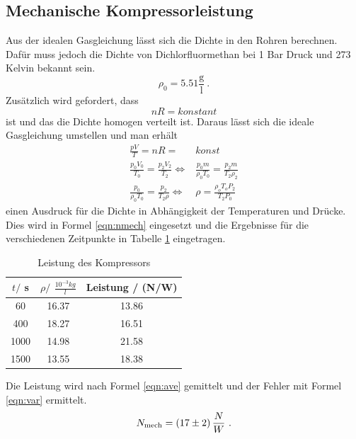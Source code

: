 \subsection{Mechanische Kompressorleistung}
Aus der idealen Gasgleichung lässt sich die Dichte in den Rohren berechnen. Dafür muss jedoch die Dichte von Dichlorfluormethan bei 1 Bar Druck und 273 Kelvin bekannt sein.
\begin{equation}
  \rho_\text{0} =  5.51 \frac{\text{g}}{\text{l}} \ .
  \label{rho}
\end{equation}
Zusätzlich wird gefordert, dass
\begin{equation}
  nR = konstant
\end{equation}
ist und das die Dichte homogen verteilt ist. Daraus lässt sich die ideale Gasgleichung umstellen und man erhält
\begin{eqnarray*}
  \frac{pV}{T} =nR =& konst \\
  \frac{p_0 V_0}{T_0} = \frac{p_2 V_2}{T_\text{2}}  \Leftrightarrow&  \frac{p_0 m}{\rho_0 T_0} = \frac{p_2 m}{T_\text{2} \rho_2} \\
  \frac{p_0}{\rho_0 T_0} = \frac{p_2}{T_\text{2} \rho} \Leftrightarrow& \rho = \frac{\rho_o T_o P_2}{T_\text{2} P_0}
  \label{eqn:rho}
\end{eqnarray*}
einen Ausdruck für die Dichte in Abhängigkeit der Temperaturen und Drücke. Dies wird in Formel \ref{eqn:nmech} eingesetzt und die Ergebnisse für die verschiedenen Zeitpunkte in Tabelle \ref{tab:LdK} eingetragen.
\begin{table}
  \centering
  \begin{tabular}{c c c}
    \toprule
    $t /$ s & $\rho /$ $\frac{10^{-3}kg}{l}$ & Leistung / (N/W) \\
    \midrule
    60   & 16.37 & 13.86 \\
    400  & 18.27 & 16.51 \\
    1000 & 14.98 & 21.58 \\
    1500 & 13.55 & 18.38 \\
    \bottomrule
  \end{tabular}
  \caption{Leistung des Kompressors}
  \label{tab:LdK}
\end{table}
Die Leistung wird nach Formel \ref{eqn:ave} gemittelt und der Fehler mit Formel \ref{eqn:var} ermittelt.
\begin{equation}
  N_{\text{mech}} = ( \num{17 +- 2} ) \, \frac{N}{W} \ .
\end{equation}
